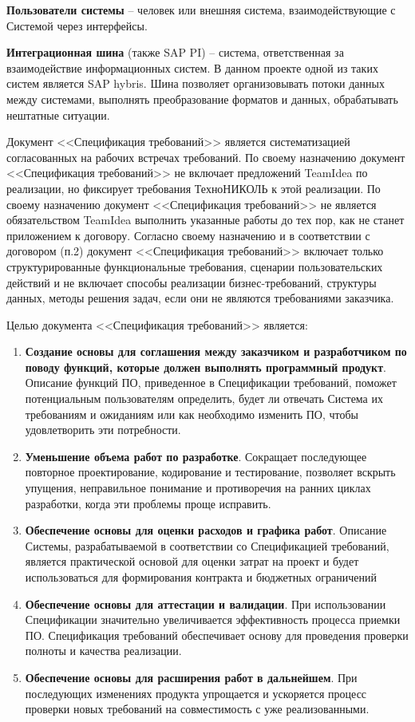 \textbf{Пользователи системы} -- человек или внешняя система, взаимодействующие с Системой через интерфейсы.

\textbf{Интеграционная шина} (также SAP PI) -- система, ответственная за взаимодействие информационных систем. В данном проекте одной из таких систем является SAP hybris. Шина позволяет организовывать потоки данных между системами, выполнять преобразование форматов и данных, обрабатывать нештатные ситуации. 



Документ <<Спецификация требований>> является систематизацией согласованных на рабочих встречах требований. По своему назначению документ <<Спецификация требований>>  не включает предложений TeamIdea по реализации, но фиксирует требования ТехноНИКОЛЬ к этой реализации. По своему назначению документ <<Спецификация требований>> не является обязательством TeamIdea выполнить указанные работы до тех пор, как не станет приложением к договору. Согласно своему назначению и в соответствии с договором (п.2) документ <<Спецификация требований>> включает только структурированные функциональные требования, сценарии пользовательских действий и не включает способы реализации бизнес-требований, структуры данных, методы решения задач, если они не являются требованиями заказчика. 


Целью документа <<Спецификация требований>> является:

\begin{enumerate}
\item \textbf{Создание основы для соглашения между заказчиком и разработчиком по поводу функций, которые должен выполнять программный продукт}. Описание функций ПО, приведенное в Спецификации требований, поможет потенциальным пользователям определить, будет ли отвечать Система их требованиям и ожиданиям или как необходимо изменить ПО, чтобы удовлетворить эти потребности. 
\item \textbf{Уменьшение объема работ по разработке}. Сокращает последующее повторное проектирование, кодирование и тестирование, позволяет вскрыть упущения, неправильное понимание и противоречия на ранних циклах разработки, когда эти проблемы проще исправить.
\item \textbf{Обеспечение основы для оценки расходов и графика работ}. Описание Системы, разрабатываемой в соответствии со Спецификацией требований, является практической основой для оценки затрат на проект и будет использоваться для формирования контракта и бюджетных ограничений
\item \textbf{Обеспечение основы для аттестации и валидации}. При использовании Спецификации значительно увеличивается эффективность процесса приемки ПО. Спецификация требований обеспечивает основу для проведения проверки полноты и качества реализации.
\item \textbf{Обеспечение основы для расширения работ в дальнейшем}. При последующих изменениях продукта упрощается и ускоряется процесс проверки новых требований на совместимость с уже реализованными.  
\end{enumerate}

